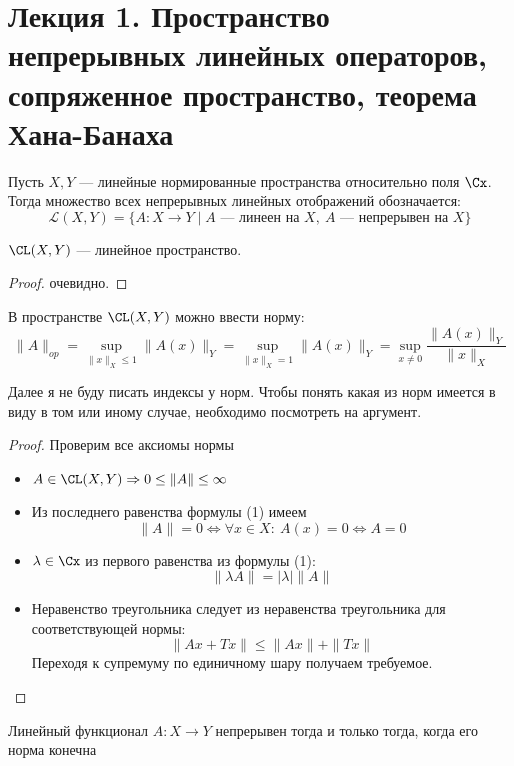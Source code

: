 \newpage
\section{Лекция 1. Пространство непрерывных линейных операторов, сопряженное пространство, теорема Хана-Банаха}


\begin{definition}
	Пусть $X,Y$ --- линейные нормированные пространства относительно поля $\Cx$. Тогда множество всех непрерывных линейных отображений обозначается:
	$$
	\mathcal{{L}}(X, Y) = \{A: X \to Y \mid A \text{ --- линеен на $X$}, \ A \text{ --- непрерывен на $X$}\}
	$$
\end{definition}

\begin{claim}
	$\CL(X,Y)$ --- линейное пространство.
\end{claim}
\begin{proof}
	очевидно. 
\end{proof}
\begin{claim}
	В пространстве $\CL(X,Y)$ можно ввести норму:
	\begin{equation}
	\|A\|_{op} = \sup\limits_{\|x\|_X \leq 1} \|A(x)\|_Y = \sup\limits_{\|x\|_X = 1} \|A(x)\|_Y = \sup\limits_{x \neq 0}\frac{\|A(x)\|_Y}{\|x\|_X}
	\end{equation}
\end{claim}
\begin{remark}
	Далее я не буду писать индексы у норм. Чтобы понять какая из норм имеется в виду в том или иному случае, необходимо посмотреть на аргумент. 
\end{remark}
\begin{proof}
	Проверим все аксиомы нормы
	\begin{itemize}
		\item$A \in \CL(X,Y) \Rightarrow 0 \leq \|A\| \leq \infty$
		\item Из последнего равенства формулы (1) имеем
		$$
		\|A\| = 0 \Leftrightarrow \forall x \in X: \ A(x) = 0 \Leftrightarrow A = 0
		$$
		\item $ \lambda \in \Cx$ из первого равенства из формулы (1):
		$$
		\|\lambda A\| = |\lambda| \|A\|
		$$
		\item Неравенство треугольника следует из неравенства треугольника для соответствующей нормы:
		$$
		\|Ax + Tx\| \leq \|Ax\| + \|Tx\|
		$$
		Переходя к супремуму по единичному шару получаем требуемое.
		\end{itemize}
\end{proof}
\begin{claim}
	Линейный функционал $A : X \to Y$ непрерывен тогда и только тогда, когда его норма конечна
\end{claim}
